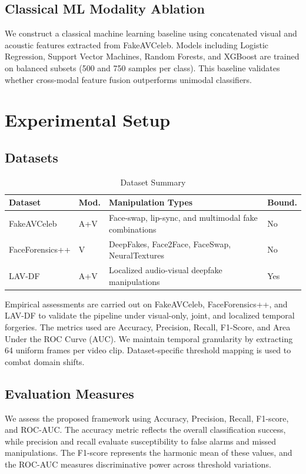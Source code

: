 \documentclass[conference]{IEEEtran}
\begin{document}
\subsection{Classical ML Modality Ablation}
We construct a classical machine learning baseline using concatenated visual and acoustic features extracted from FakeAVCeleb. Models including Logistic Regression, Support Vector Machines, Random Forests, and XGBoost are trained on balanced subsets (500 and 750 samples per class). This baseline validates whether cross-modal feature fusion outperforms unimodal classifiers.

\section{Experimental Setup}
\subsection{Datasets}
\begin{table}[htbp]
\caption{Dataset Summary}
\centering
\begin{tabular}{p{1.55cm}p{1.15cm}p{2.6cm}p{0.85cm}}
\toprule
Dataset & Mod. & Manipulation Types & Bound. \\
\midrule
FakeAVCeleb & A+V & Face-swap, lip-sync, and multimodal fake combinations & No \\
FaceForensics++ & V & DeepFakes, Face2Face, FaceSwap, NeuralTextures & No \\
LAV-DF & A+V & Localized audio-visual deepfake manipulations & Yes \\
\bottomrule
\end{tabular}
\end{table}

Empirical assessments are carried out on FakeAVCeleb, FaceForensics++, and LAV-DF to validate the pipeline under visual-only, joint, and localized temporal forgeries. The metrics used are Accuracy, Precision, Recall, F1-Score, and Area Under the ROC Curve (AUC). We maintain temporal granularity by extracting 64 uniform frames per video clip. Dataset-specific threshold mapping is used to combat domain shifts.

\subsection{Evaluation Measures}
We assess the proposed framework using Accuracy, Precision, Recall, F1-score, and ROC-AUC. The accuracy metric reflects the overall classification success, while precision and recall evaluate susceptibility to false alarms and missed manipulations. The F1-score represents the harmonic mean of these values, and the ROC-AUC measures discriminative power across threshold variations.
\end{document}

